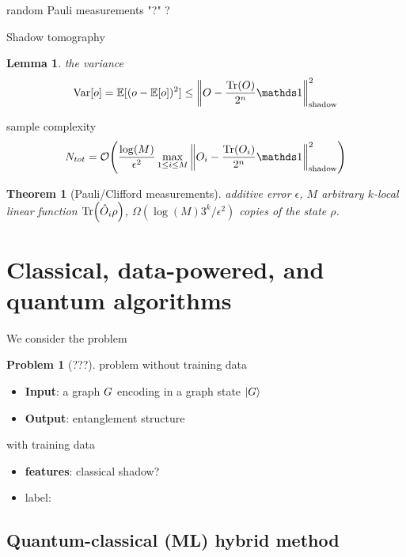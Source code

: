 \documentclass[
aps,
pra,
linenumbers,
floatfix,
]{revtex4-2}
\theoremstyle{plain}
\newtheorem{theorem}{Theorem}
\newtheorem{lemma}{Lemma}
\theoremstyle{definition}
\newtheorem{problem}{Problem}
\newcommand{\shadow}{\text{shadow}}
\newcommand{\ob}{\hat{O}}
\newcommand{\dm}{\rho}
\begin{document}
\begin{algorithm}[H]
    \DontPrintSemicolon
    \Input{density matrix $\dm$, ..}
    \BlankLine
     {
        random Pauli measurements 
    {\Return "?"}
    }
    \Return ?
    \caption{Shadow tomography}
    \label{alg:classical_shadow}
\end{algorithm}
\begin{lemma}
	the variance
	\begin{equation}
		\variance[o] = \expectation[(o-\expectation[o])^2]
		\le \norm{O - \frac{\Tr(O)}{2^n} \identity}^2_{\shadow}
	\end{equation}
\end{lemma}
sample complexity
\begin{equation}
	N_{tot} = \bigO \qty(
		\frac{\log (M)}{\epsilon^2} \max_{1\le i\le M} 
		\norm{O_i - \frac{\Tr(O_i)}{2^n} \identity}^2_{\shadow}
	)
\end{equation}
\begin{theorem}[Pauli/Clifford measurements]
	additive error $\epsilon$, $M$ arbitrary $k$-local linear function $\Tr(\ob_i\dm)$,
	$\Omega(\log(M) 3^k/\epsilon^2)$ copies of the state $\dm$.
\end{theorem}

\section{Classical, data-powered, and quantum algorithms}
We consider the problem 
\begin{problem}[???]
	problem without training data
	\begin{itemize}
		\item \textbf{Input}: a graph $G$ encoding in a graph state $\ket{G}$
		\item \textbf{Output}: entanglement structure
	\end{itemize}
	with training data
	\begin{itemize}
		\item \textbf{features}: classical shadow?
		\item label: 
	\end{itemize}
\end{problem}

\subsection{Quantum-classical (ML) hybrid method}
\end{document}
